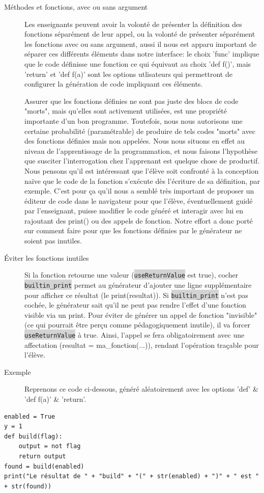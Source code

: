 \documentclass[11pt,a4paper]{article}
\newcommand{\code}[1]{\colorbox{lightgray}{\texttt{\small #1}}}
\begin{document}
\begin{description}
    \item[Méthodes et fonctions, avec ou sans argument] Les enseignants peuvent avoir la volonté de présenter la définition des fonctions séparément de leur appel, ou la volonté de présenter séparément les fonctions avec ou sans argument, aussi il nous est apparu important de séparer ces différents éléments dans notre interface: le choix 'func' implique que le code définisse une fonction ce qui équivaut au choix 'def f()', mais 'return' et 'def f(a)' sont les options utlisateurs qui permettront de configurer la génération de code impliquant ces éléments.
    \par Assurer que les fonctions définies ne sont pas juste des blocs de code "morts", mais qu'elles sont activement utilisées, est une propriété importante d'un bon programme. Toutefois, nous nous autorisons une certaine probabilité (paramétrable) de produire de tels codes "morts" avec des fonctions définies mais non appelées. Nous nous situons en effet au niveau de l'apprentissage de la programmation, et nous faisons l'hypothèse que susciter l'interrogation chez l'apprenant est quelque chose de productif. Nous pensons qu'il est intéressant que l'élève soit confronté à la conception naïve que le code de la fonction s'exécute dès l'écriture de sa définition, par exemple. C'est pour ça qu'il nous a semblé très important de proposer un éditeur de code dans le navigateur pour que l'élève, éventuellement guidé par l'enseignant, puisse modifier le code généré et interagir avec lui en rajoutant des print() ou des appels de fonction. Notre effort a donc porté sur comment faire pour que les fonctions définies par le générateur ne soient pas inutiles.
    \item[Éviter les fonctions inutiles] Si la fonction retourne une valeur (\code{useReturnValue} est true), cocher \code{builtin\_print} permet au générateur d'ajouter une ligne supplémentaire pour afficher ce résultat (le print(resultat)). Si \code{builtin\_print} n'est pas cochée, le générateur sait qu'il ne peut pas rendre l'effet d'une fonction visible via un print. Pour éviter de générer un appel de fonction "invisible" (ce qui pourrait être perçu comme pédagogiquement inutile), il va forcer \code{useReturnValue} à true. Ainsi, l'appel se fera obligatoirement avec une affectation (resultat = ma\_fonction(...)), rendant l'opération traçable pour l'élève.
    \item[Exemple] Reprenons ce code ci-dessous, généré aléatoirement avec les options 'def' \& 'def f(a)' \& 'return'.
\end{description}
\begin{verbatim}
enabled = True
y = 1
def build(flag):
    output = not flag
    return output
found = build(enabled)
print("Le résultat de " + "build" + "(" + str(enabled) + ")" + " est " + str(found))
\end{verbatim}
\end{document}
